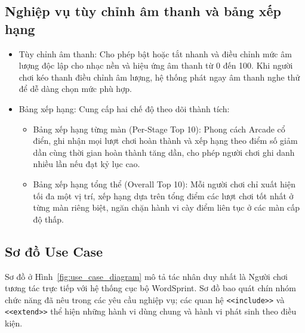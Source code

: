\subsection{Nghiệp vụ tùy chỉnh âm thanh và bảng xếp hạng}
\label{subsec:audio_and_leaderboard}
\begin{itemize}
    \item Tùy chỉnh âm thanh: Cho phép bật hoặc tắt nhanh và điều chỉnh mức âm lượng độc lập cho nhạc nền và hiệu ứng âm thanh từ 0 đến 100. Khi người chơi kéo thanh điều chỉnh âm lượng, hệ thống phát ngay âm thanh nghe thử để dễ dàng chọn mức phù hợp.
    \item Bảng xếp hạng: Cung cấp hai chế độ theo dõi thành tích:
    \begin{itemize}
        \item Bảng xếp hạng từng màn (Per-Stage Top 10): Phong cách Arcade cổ điển, ghi nhận mọi lượt chơi hoàn thành và xếp hạng theo điểm số giảm dần cùng thời gian hoàn thành tăng dần, cho phép người chơi ghi danh nhiều lần nếu đạt kỷ lục cao.
        \item Bảng xếp hạng tổng thể (Overall Top 10): Mỗi người chơi chỉ xuất hiện tối đa một vị trí, xếp hạng dựa trên tổng điểm các lượt chơi tốt nhất ở từng màn riêng biệt, ngăn chặn hành vi cày điểm liên tục ở các màn cấp độ thấp.
    \end{itemize}
\end{itemize}

\subsection{Sơ đồ Use Case}
\label{subsec:use_case_diagram}
Sơ đồ ở Hình~\ref{fig:use_case_diagram} mô tả tác nhân duy nhất là Người chơi tương tác trực tiếp với hệ thống cục bộ WordSprint. Sơ đồ bao quát chín nhóm chức năng đã nêu trong các yêu cầu nghiệp vụ; các quan hệ \texttt{<<include>>} và \texttt{<<extend>>} thể hiện những hành vi dùng chung và hành vi phát sinh theo điều kiện.

